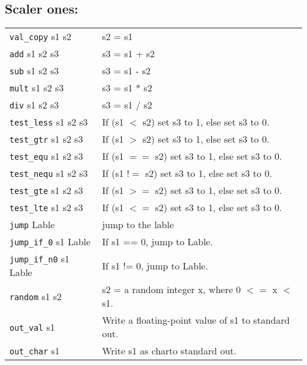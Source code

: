 \documentclass[10pt,landscape]{article}
\begin{document}
\begin{multicols}{3}
        \subsection{Scaler ones:}
        \begin{supertabular}{p{.1\textwidth} p{.18\textwidth}} 
        \verb!val_copy! s1 s2       & s2 = s1 \\
        \verb!add! s1 s2  s3        & s3 = s1 + s2\\
        \verb!sub! s1 s2  s3        & s3 = s1 - s2 \\
        \verb!mult! s1 s2  s3       & s3 = s1 * s2 \\
        \verb!div! s1 s2  s3        & s3 = s1 / s2 \\
        \verb!test_less! s1 s2  s3  & If (s1 $<$ s2) set s3 to 1, else set s3 to 0. \\
        \verb!test_gtr! s1 s2  s3   & If (s1 $>$ s2) set s3 to 1, else set s3 to 0. \\
        \verb!test_equ! s1 s2  s3   & If (s1 $==$ s2) set s3 to 1, else set s3 to 0. \\
        \verb!test_nequ! s1 s2  s3  & If (s1 $!=$ s2) set s3 to 1, else set s3 to 0. \\
        \verb!test_gte! s1 s2  s3   & If (s1 $>=$ s2) set s3 to 1, else set s3 to 0. \\
        \verb!test_lte! s1 s2  s3   & If (s1 $<=$ s2) set s3 to 1, else set s3 to 0. \\
        \verb!jump! Lable       & jump to the lable \\
        \verb!jump_if_0! s1 Lable      & If s1 == 0, jump to Lable. \\
        \verb!jump_if_n0! s1 Lable       & If s1 != 0, jump to Lable. \\
        \verb!random! s1 s2       & s2 = a random integer x, where 0 $<=$ x $<$ s1. \\
        \verb!out_val! s1       & Write a floating-point value of s1 to standard out. \\
        \verb!out_char! s1      & Write s1 as charto standard out. \\
        \end{supertabular} \\

\end{multicols}
\end{document}
